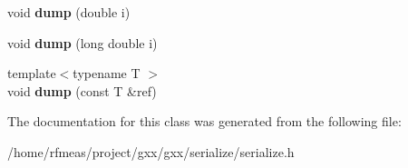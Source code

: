 \begin{DoxyCompactItemize}
\item 
void {\bfseries dump} (double i)\hypertarget{classgxx_1_1archive_1_1binary__serializer__basic_a03b6fe9f681d4a4370b97ee9150da506}{}\label{classgxx_1_1archive_1_1binary__serializer__basic_a03b6fe9f681d4a4370b97ee9150da506}

\item 
void {\bfseries dump} (long double i)\hypertarget{classgxx_1_1archive_1_1binary__serializer__basic_a322a38bbac67825232b635474d9167d6}{}\label{classgxx_1_1archive_1_1binary__serializer__basic_a322a38bbac67825232b635474d9167d6}

\item 
{\footnotesize template$<$typename T $>$ }\\void {\bfseries dump} (const T \&ref)\hypertarget{classgxx_1_1archive_1_1binary__serializer__basic_ae7baa8542e7e32ddd0bf25ec845c031a}{}\label{classgxx_1_1archive_1_1binary__serializer__basic_ae7baa8542e7e32ddd0bf25ec845c031a}

\end{DoxyCompactItemize}


The documentation for this class was generated from the following file\+:\begin{DoxyCompactItemize}
\item 
/home/rfmeas/project/gxx/gxx/serialize/serialize.\+h\end{DoxyCompactItemize}
